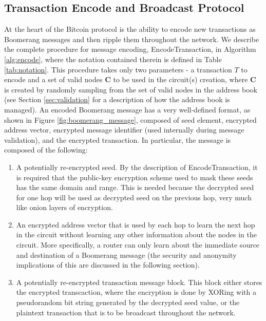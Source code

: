 \subsection{Transaction Encode and Broadcast Protocol} \label{sec:broadcast-protocol}

At the heart of the Bitcoin protocol is the ability to encode new transactions as Boomerang messages and then ripple them throughout the network. We describe the complete procedure for message encoding, {\sf EncodeTransaction}, in Algorithm \ref{alg:encode}, where the notation contained therein is defined in Table \ref{tab:notation}. This procedure takes only two parameters - a transaction $T$ to encode and a set of valid nodes $\mathbf{C}$ to be used in the circuit(s) creation, where $\mathbf{C}$ is created by randomly sampling from the set of valid nodes in the address book (see Section \ref{sec:validation} for a description of how the address book is managed). An encoded Boomerang message has a very well-defined format, as shown in Figure \ref{fig:boomerang_message}, composed of seed element, encrypted address vector, encrypted message identifier (used internally during message validation), and the encrypted transaction. In particular, the message is composed of the following:
\begin{enumerate}
	\item A potentially re-encrypted seed. By the description of {\sf EncodeTransaction}, it is required that the public-key encryption scheme used to mask these seeds has the same domain and range. This is needed because the decrypted seed for one hop will be used as decrypted seed on the previous hop, very much like onion layers of encryption.
	\item An encrypted address vector that is used by each hop to learn the next hop in the circuit without learning any other information about the nodes in the circuit. More specifically, a router can only learn about the immediate source and destination of a Boomerang message (the security and anonymity implications of this are discussed in the following section).
	\item A potentially re-encrypted transaction message block. This block either stores the encrypted transcaction, where the encryption is done by XORing with a pseudorandom bit string generated by the decrypted seed value, or the plaintext transaction that is to be broadcast throughout the network.
\end{enumerate}

